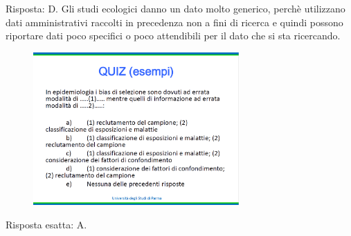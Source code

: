 Risposta: D.
\newpage
Gli studi ecologici danno un dato molto generico, perchè utilizzano dati
amministrativi raccolti in precedenza non a fini di ricerca e quindi
possono riportare dati poco specifici o poco attendibili per il dato che
si sta ricercando.

\begin{figure}[!ht]
\centering
\includegraphics[width=0.7\textwidth]{05/image18.png}
\end{figure}

Risposta esatta: A.

